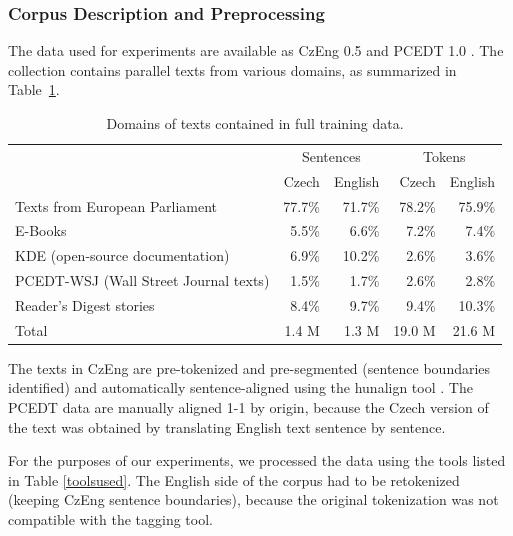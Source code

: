 \documentclass[10pt]{report}
\theoremstyle{plain}
\begin{document}
{{\subsubsection{Corpus Description and Preprocessing}
\label{tools}


The data used for \bidir{} experiments are available as CzEng 0.5
 and PCEDT 1.0 . The collection contains parallel texts from various domains, as
summarized in Table~\ref{czengratios}.


\begin{table}[ht]
\begin{tabular}{lrr|rr}
  &  \multicolumn{2}{c}{Sentences}  &  \multicolumn{2}{c}{Tokens}\\
  &  Czech                             &  English                          &  Czech  &  English\\
\hline
Texts from European Parliament         &  77.7\%  &  71.7\%  &  78.2\%  &  75.9\%\\
E-Books                                &  5.5\%   &  6.6\%   &  7.2\%   &  7.4\%\\
KDE (open-source documentation)        &  6.9\%   &  10.2\%  &  2.6\%   &  3.6\%\\
PCEDT-WSJ (Wall Street Journal texts)  &  1.5\%   &  1.7\%   &  2.6\%   &  2.8\%\\
Reader's Digest stories                &  8.4\%   &  9.7\%   &  9.4\%   &  10.3\%\\
\hline
Total                                  &  1.4 M   &  1.3 M   &  19.0 M  &  21.6 M\\
\end{tabular}
\caption{Domains of texts contained in full training data.}
\label{czengratios}
\end{table}

The texts in CzEng are pre-tokenized and pre-segmented (sentence boundaries identified) and
automatically sentence-aligned using the hunalign tool
. The
PCEDT data are manually aligned 1-1 by origin, because the Czech
version of the text was obtained by translating English text sentence by
sentence.

For the purposes of our experiments, we processed the data using the tools
listed in Table \ref{toolsused}.
The English side of the corpus had to be retokenized (keeping CzEng sentence
boundaries), because the original tokenization was not compatible with the tagging tool.

}}
\end{document}
